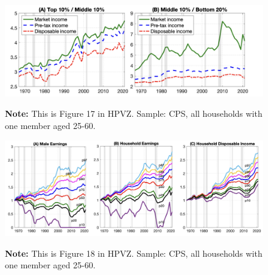 \documentclass[11pt, aspectratio=169]{beamer}
\begin{document}
\begin{frame}{}
	\begin{figure}
		\includegraphics[scale=0.38]{./figures/inequality_government_2}
	\vspace*{-2mm}
	\begin{flushleft}
		{\scriptsize \hspace{6mm} \textbf{Note:} This is Figure 17 in HPVZ. Sample: CPS, all households with one member aged 25-60.}
	\end{flushleft}	
	\end{figure}
\end{frame}


\begin{frame}{}
	\begin{figure}
		\includegraphics[scale=0.3]{./figures/inequality_government_3}
	\vspace*{-2mm}
	\begin{flushleft}
		{\scriptsize \hspace{6mm} \textbf{Note:} This is Figure 18 in HPVZ. Sample: CPS, all households with one member aged 25-60.}
	\end{flushleft}	
	\end{figure}
\end{frame}
\end{document}
